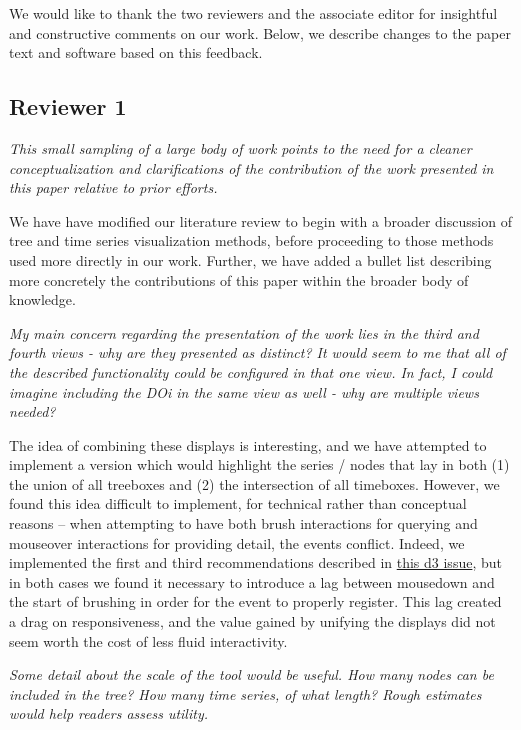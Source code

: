\documentclass{article}
\begin{document}
We would like to thank the two reviewers and the associate editor for insightful
and constructive comments on our work. Below, we describe changes to the paper
text and software based on this feedback.

\subsection{Reviewer 1}

\textit{This small sampling of a large body of work points to the need for a
  cleaner conceptualization and clarifications of the contribution of the work
  presented in this paper relative to prior efforts.}

We have have modified our literature review to begin with a broader discussion
of tree and time series visualization methods, before proceeding to those
methods used more directly in our work. Further, we have added a bullet list
describing more concretely the contributions of this paper within the broader
body of knowledge.

\textit{My main concern regarding the presentation of the work lies in the third
  and fourth views - why are they presented as distinct? It would seem to me
  that all of the described functionality could be configured in that one view.
  In fact, I could imagine including the DOi in the same view as well - why are
  multiple views needed?}

The idea of combining these displays is interesting, and we have attempted to
implement a version which would highlight the series / nodes that lay in both
(1) the union of all treeboxes and (2) the intersection of all timeboxes.
However, we found this idea difficult to implement, for technical rather than
conceptual reasons -- when attempting to have both brush interactions for
querying and mouseover interactions for providing detail, the events conflict.
Indeed, we implemented the first and third recommendations described in
\href{https://github.com/d3/d3/issues/1604}{this d3 issue}, but in both cases we
found it necessary to introduce a lag between mousedown and the start of
brushing in order for the event to properly register. This lag created a drag on
responsiveness, and the value gained by unifying the displays did not seem worth
the cost of less fluid interactivity.

\textit{Some detail about the scale of the tool would be useful. How many nodes
  can be included in the tree? How many time series, of what length? Rough
  estimates would help readers assess utility.}
\end{document}
